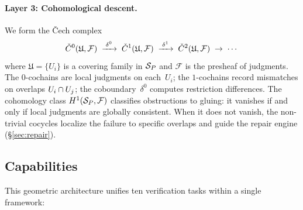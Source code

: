 \paragraph{Layer 3: Cohomological descent.}
We form the \v{C}ech complex
\[
  \check{C}^0(\mathfrak{U}, \mathcal{F})
  \;\xrightarrow{\;\delta^0\;}\;
  \check{C}^1(\mathfrak{U}, \mathcal{F})
  \;\xrightarrow{\;\delta^1\;}\;
  \check{C}^2(\mathfrak{U}, \mathcal{F})
  \;\to\; \cdots
\]
where $\mathfrak{U} = \{U_i\}$ is a covering family in $\mathcal{S}_P$ and
$\mathcal{F}$ is the presheaf of judgments.  The $0$-cochains are local
judgments on each~$U_i$; the $1$-cochains record mismatches on overlaps
$U_i \cap U_j$; the coboundary~$\delta^0$ computes restriction
differences.  The cohomology class $H^{1}(\mathcal{S}_P, \mathcal{F})$
classifies obstructions to gluing: it vanishes if and only if local
judgments are globally consistent.  When it does not vanish, the
non-trivial cocycles localize the failure to specific overlaps and
guide the repair engine (\S\ref{sec:repair}).

\subsection{Capabilities}\label{sec:intro:capabilities}

This geometric architecture unifies ten verification tasks within a single
framework:

